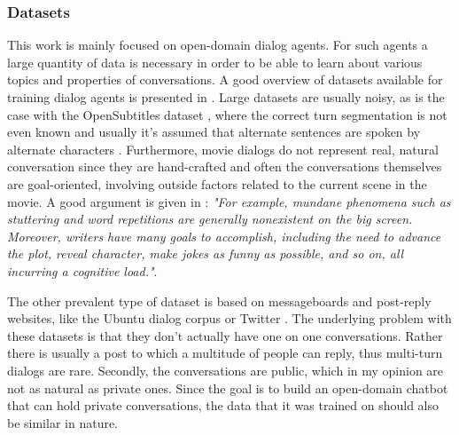 \documentclass[12pt]{article}
\begin{document}
\subsubsection{Datasets} \label{sssec:datasets}
This work is mainly focused on open-domain dialog agents. For such agents a large quantity of data is necessary in order to be able to learn about various topics and properties of conversations. A good overview of datasets available for training dialog agents is presented in \cite{Serban_survey:2015}. Large datasets are usually noisy, as is the case with the OpenSubtitles dataset \cite{OpenSubtitles:2016,opensubtitles}, where the correct turn segmentation is not even known and usually it's assumed that alternate sentences are spoken by alternate characters \cite{Vinyals:2015}. Furthermore, movie dialogs do not represent real, natural conversation since they are hand-crafted and often the conversations themselves are goal-oriented, involving outside factors related to the current scene in the movie. A good argument is given in \cite{Danescu:2011}: \textit{"For example, mundane phenomena such as stuttering and word repetitions are generally nonexistent on the big screen. Moreover, writers have many goals to accomplish, including the need to advance the plot, reveal character, make jokes as funny as possible, and so on, all incurring a cognitive load."}.

The other prevalent type of dataset is based on messageboards and post-reply websites, like the Ubuntu dialog corpus \cite{Lowe:2015} or Twitter \cite{Shang:2015,Li:2016,Jena:2017}. The underlying problem with these datasets is that they don't actually have one on one conversations. Rather there is usually a post to which a multitude of people can reply, thus multi-turn dialogs are rare. Secondly, the conversations are public, which in my opinion are not as natural as private ones. Since the goal is to build an open-domain chatbot that can hold private conversations, the data that it was trained on should also be similar in nature.
\end{document}
